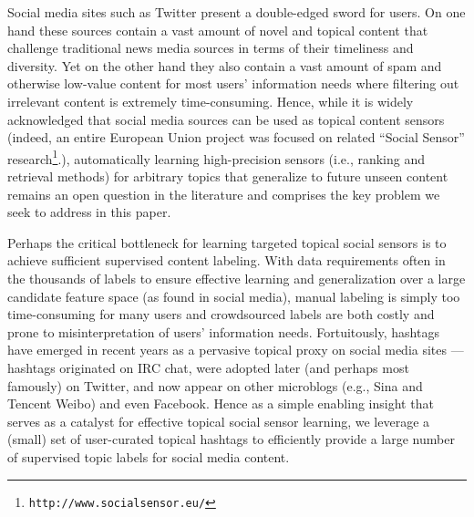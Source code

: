 
\label{sec:introduction}

Social media sites such as Twitter present a double-edged sword for
users.  On one hand these sources contain a vast amount of novel and
topical content that challenge traditional news media sources in terms
of their timeliness and diversity.  Yet on the other hand they also
contain a vast amount of spam and otherwise low-value content for most
users' information needs where filtering out irrelevant content is
extremely time-consuming.  Hence, while it is widely acknowledged that
social media sources can be used as topical content sensors (indeed,
an entire European Union project was focused on related ``Social Sensor''
research\footnote{\texttt{http://www.socialsensor.eu/}}.),
automatically learning high-precision sensors (i.e., ranking and
retrieval methods) for arbitrary topics that generalize to future
unseen content remains an open question in the literature and
comprises the key problem we seek to address in this paper.

Perhaps the critical bottleneck for learning targeted topical social
sensors is to achieve sufficient supervised content labeling.  With
data requirements often in the thousands of labels to ensure effective
learning and generalization over a large candidate feature space (as
found in social media),
manual labeling is simply too time-consuming for many users and
crowdsourced labels are both costly and prone to misinterpretation of
users' information needs.  Fortuitously, hashtags have emerged in
recent years as a pervasive topical proxy on social media sites ---
hashtags originated on IRC chat, were adopted later (and perhaps most
famously) on Twitter, and now appear on other microblogs (e.g., Sina
and Tencent Weibo) and even Facebook.  Hence as a simple enabling
insight that serves as a catalyst for effective topical social sensor
learning, we leverage a (small) set of user-curated topical hashtags
to efficiently provide a large number of supervised topic labels for
social media content.

